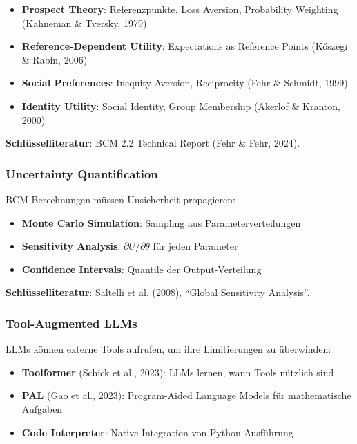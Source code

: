 \documentclass[12pt,a4paper]{article}
\begin{document}
\begin{itemize}
    \item \textbf{Prospect Theory}: Referenzpunkte, Loss Aversion, Probability Weighting (Kahneman \& Tversky, 1979)
    \item \textbf{Reference-Dependent Utility}: Expectations as Reference Points (K\H{o}szegi \& Rabin, 2006)
    \item \textbf{Social Preferences}: Inequity Aversion, Reciprocity (Fehr \& Schmidt, 1999)
    \item \textbf{Identity Utility}: Social Identity, Group Membership (Akerlof \& Kranton, 2000)
\end{itemize}

\textbf{Schlüsselliteratur}: BCM 2.2 Technical Report (Fehr \& Fehr, 2024).

\subsubsection{Uncertainty Quantification}

BCM-Berechnungen müssen Unsicherheit propagieren:

\begin{itemize}
    \item \textbf{Monte Carlo Simulation}: Sampling aus Parameterverteilungen
    \item \textbf{Sensitivity Analysis}: $\partial U / \partial \theta$ für jeden Parameter
    \item \textbf{Confidence Intervals}: Quantile der Output-Verteilung
\end{itemize}

\textbf{Schlüsselliteratur}: Saltelli et al. (2008), ``Global Sensitivity Analysis''.

\subsubsection{Tool-Augmented LLMs}

LLMs können externe Tools aufrufen, um ihre Limitierungen zu überwinden:

\begin{itemize}
    \item \textbf{Toolformer} (Schick et al., 2023): LLMs lernen, wann Tools nützlich sind
    \item \textbf{PAL} (Gao et al., 2023): Program-Aided Language Models für mathematische Aufgaben
    \item \textbf{Code Interpreter}: Native Integration von Python-Ausführung
\end{itemize}
\end{document}

